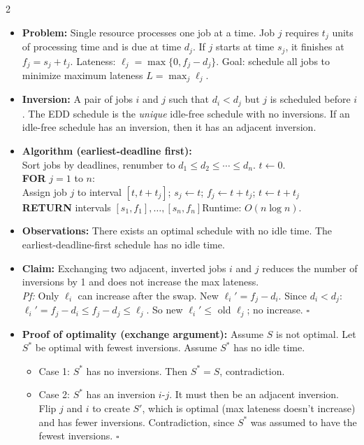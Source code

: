 \documentclass[9pt]{article}
\begin{document}
\begin{multicols}{2}
\begin{itemize}
  \item \textbf{Problem:} Single resource processes one job at a time. Job $j$ requires $t_j$ units of processing time and is due at time $d_j$. If $j$ starts at time $s_j$, it finishes at $f_j=s_j+t_j$. Lateness: $\ell_j=\max\{0,f_j-d_j\}$. Goal: schedule all jobs to minimize maximum lateness $L=\max_j\ell_j$.
  \item \textbf{Inversion:} A pair of jobs $i$ and $j$ such that $d_i<d_j$ but $j$ is scheduled before $i$. The EDD schedule is the \emph{unique} idle-free schedule with no inversions. If an idle-free schedule has an inversion, then it has an adjacent inversion.
  \item \textbf{Algorithm (earliest-deadline first):}\\
  Sort jobs by deadlines, renumber to $d_1\le d_2\le\cdots\le d_n$. $t\leftarrow0$.\\
  \textbf{FOR} $j=1$ to $n$:\\
  \hspace*{8pt}Assign job $j$ to interval $[t,t+t_j]$;\; $s_j\leftarrow t$;\; $f_j\leftarrow t+t_j$;\; $t\leftarrow t+t_j$\\
  \textbf{RETURN} intervals $[s_1,f_1],\dots,[s_n,f_n]$\quad Runtime: $O(n\log n)$.
  \item \textbf{Observations:} There exists an optimal schedule with no idle time. The earliest-deadline-first schedule has no idle time.
  \item \textbf{Claim:} Exchanging two adjacent, inverted jobs $i$ and $j$ reduces the number of inversions by 1 and does not increase the max lateness.\\
  \textit{Pf:} Only $\ell_i$ can increase after the swap. New $\ell_i'=f_j-d_i$. Since $d_i<d_j$: $\ell_i'=f_j-d_i\le f_j-d_j\le\ell_j$. So new $\ell_i'\le$ old $\ell_j$; no increase. $\square$
  \item \textbf{Proof of optimality (exchange argument):} Assume $S$ is not optimal. Let $S^*$ be optimal with fewest inversions. Assume $S^*$ has no idle time.
  \begin{itemize}
    \item Case 1: $S^*$ has no inversions. Then $S^*=S$, contradiction.
    \item Case 2: $S^*$ has an inversion $i$-$j$. It must then be an adjacent inversion. Flip $j$ and $i$ to create $S'$, which is optimal (max lateness doesn't increase) and has fewer inversions. Contradiction, since $S^*$ was assumed to have the fewest inversions. $\square$
  \end{itemize}
\end{itemize}


\end{multicols}
\end{document}
